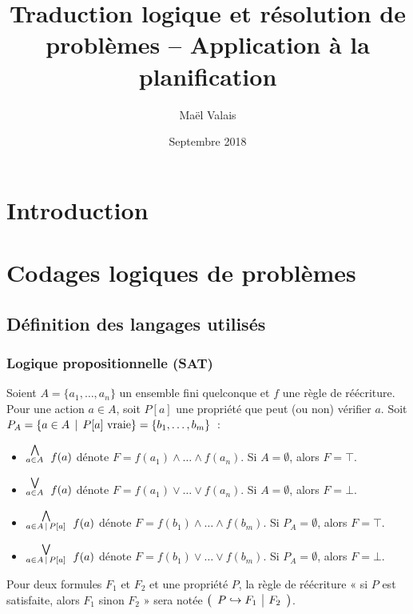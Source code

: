 \documentclass[a4paper,12pt,oneside,fullcap,chkrefs,webpdf64,m3L,cmr,mathcenter,noSciVerse,amsmath]{extbook}
\title{Traduction logique et résolution de problèmes -- Application à la planification}
\author{Maël Valais}
\date{Septembre 2018}
\begin{document}
\tableofcontents

\chapter{Introduction}




\chapter{Codages logiques de problèmes}

\section{Définition des langages utilisés}
\subsection{Logique propositionnelle (SAT)}

{\color{red}

Soient $A=\{a_1, \ldots, a_n\}$ un ensemble fini quelconque et $f$ une règle de
réécriture.  Pour une action $a\in A$, soit $P[a]$ une propriété que peut (ou
non) vérifier $a$. Soit $P_A=\{a\in A \,\mid\, P[a]\
\mathrm{vraie}\}=\{b_1,\ldots,b_m\}$~:
\begin{itemize}
\item $\stackrel{\bigwedge}{_{a\in A}}~ f(a)$ dénote $F=f(a_1) \land\ldots\land f(a_n)$. Si $A=\emptyset$, alors $F=\top$.
\item $\stackrel{\bigvee}{_{a\in A}}~ f(a)$ dénote $F=f(a_1) \lor\ldots\lor f(a_n)$. Si $A=\emptyset$, alors $F=\bot$.
\item $\stackrel{\bigwedge}{_{a\in A \,\mid\, P[a]}}~ f(a)$ dénote $F=f(b_1) \land\ldots\land f(b_m)$. Si $P_A=\emptyset$, alors $F=\top$.
\item $\stackrel{\bigvee}{_{a\in A \,\mid\, P[a]}}~ f(a)$ dénote $F=f(b_1) \lor\ldots\lor f(b_m)$. Si $P_A=\emptyset$, alors $F=\bot$.
\end{itemize}

Pour deux formules $F_1$ et $F_2$ et une propriété $P$, la règle de réécriture
« si $P$ est satisfaite, alors $F_1$ sinon $F_2$ » sera notée
$\left(\begin{array}{l|l}{P}\hookrightarrow{F_1} & {F_2}\end{array}\right)$.
}
\end{document}
